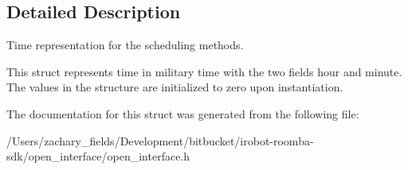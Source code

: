 \subsection{Detailed Description}
Time representation for the scheduling methods. 

This struct represents time in military time with the two fields hour and minute. The values in the structure are initialized to zero upon instantiation. 

The documentation for this struct was generated from the following file\+:\begin{DoxyCompactItemize}
\item 
/\+Users/zachary\+\_\+fields/\+Development/bitbucket/irobot-\/roomba-\/sdk/open\+\_\+interface/open\+\_\+interface.\+h\end{DoxyCompactItemize}
